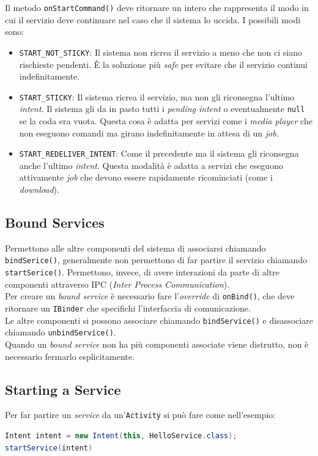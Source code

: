 Il metodo \texttt{onStartCommand()} deve ritornare un intero che rappresenta il modo in cui il servizio deve continuare nel caso che il sistema lo uccida. I possibili modi sono:

\begin{itemize}
	\item \texttt{START\_NOT\_STICKY}: Il sistema non ricrea il servizio a meno che non ci siano rischieste pendenti. È la soluzione più \textit{safe} per evitare che il servizio continui indefinitamente.
	\item \texttt{START\_STICKY}: Il sistema ricrea il servizio, ma non gli riconsegna l'ultimo \textit{intent}. Il sistema gli da in pasto tutti i \textit{pending intent} o eventualmente \texttt{null} se la coda era vuota.
	Questa cosa è adatta per servizi come i \textit{media player} che non eseguono comandi ma girano indefinitamente in attesa di un \textit{job}.
	\item \texttt{START\_REDELIVER\_INTENT}: Come il precedente ma il sistema gli riconsegna anche l'ultimo \textit{intent}. Questa modalità è adatta a servizi che eseguono attivamente \textit{job} che devono essere rapidamente ricominciati (come i \textit{download}).
\end{itemize}

\subsection{Bound Services}
Permettono alle altre componenti del sistema di associarsi chiamando \texttt{bindSerice()}, generalmente non permettono di far partire il servizio chiamando \texttt{startSerice()}. Permettono, invece, di avere interazioni da parte di altre componenti attraverso IPC (\textit{Inter Process Communication}).\\
Per creare un \textit{bound service} è necessario fare l'\textit{override} di \texttt{onBind()}, che deve ritornare un \texttt{IBinder} che specifichi l'interfaccia di comunicazione.\\
Le altre componenti si possono associare chiamando \texttt{bindService()} e disassociare chiamando \texttt{unbindService()}.\\
Quando un \textit{bound service} non ha più componenti associate viene distrutto, non è necessario fermarlo esplicitamente.


\subsection{Starting a Service}
Per far partire un \textit{service} da un'\texttt{Activity} si può fare come nell'esempio:
\begin{lstlisting}[language=Java]
Intent intent = new Intent(this, HelloService.class);
startService(intent)
\end{lstlisting}

